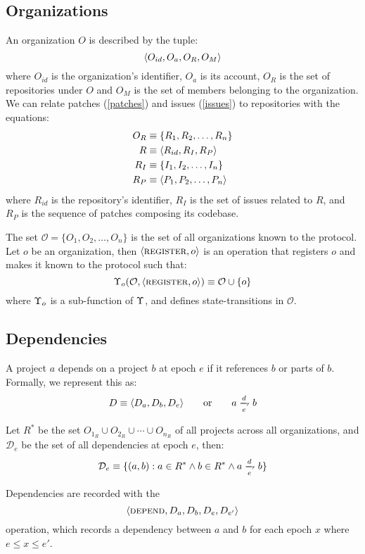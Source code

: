 \subsection{Organizations}
\label{orgs}

An organization $O$ is described by the tuple:
\[
    \langle O_{id}, O_{a}, O_R, O_M \rangle
\]
where $O_{id}$ is the organization's identifier, $O_a$ is its account, $O_R$ is
the set of repositories under $O$ and $O_M$ is the set of members belonging to
the organization. We can relate patches (\ref{patches}) and issues
(\ref{issues}) to repositories with the equations:
\begin{align*}
    O_R & \equiv \{R_1, R_2, \dotsc, R_n\}         \\
    R   & \equiv \langle R_{id}, R_I, R_P \rangle         \\
    R_I & \equiv \{I_1, I_2, \dotsc, I_n\}         \\
    R_P & \equiv \langle P_1, P_2, \dotsc, P_n \rangle
\end{align*}
where $R_{id}$ is the repository's identifier, $R_I$ is the set of issues
related to $R$, and $R_P$ is the sequence of patches composing its codebase.

The set $\mathcal{O} = \{O_1, O_2, \dotsc, O_n\}$ is the set of all organizations
known to the protocol.  Let $o$ be an organization, then $\langle \text{\normalfont\scshape register}, o \rangle$ is
an operation that registers $o$ and makes it known to the protocol such that:
\[
    \Upsilon_o(\mathcal{O}, \langle \text{\normalfont\scshape register}, o \rangle)
    \equiv \mathcal{O} \cup \{o\}
\]
where $\Upsilon_o$ is a sub-function of $\Upsilon$, and defines
state-transitions in $\mathcal{O}$.

\subsection{Dependencies}
\label{dependencies}

A project $a$ depends on a project $b$ at epoch $e$ if it references $b$
or parts of $b$. Formally, we represent this as:
\[
    D \equiv \tuple{D_a, D_b, D_e} \qquad \text{or} \qquad a \dep b
\]


Let $R^*$ be the set $O_{1_R} \cup O_{2_R} \cup \cdots \cup
O_{n_R}$ of all projects across all organizations, and $\mathcal{D}_e$ be the
set of all dependencies at epoch $e$, then:
\[
    \mathcal{D}_e \equiv \{(a, b) : a \in R^*
    \land b \in R^*
    \land a \dep b \}
\]

Dependencies are recorded with the
\[
    \langle \text{\normalfont\scshape depend}, D_a, D_b, D_e, D_{e'} \rangle
\]
operation, which records a dependency between $a$ and $b$ for each epoch $x$
where $e \leqslant x \leqslant e'$.


